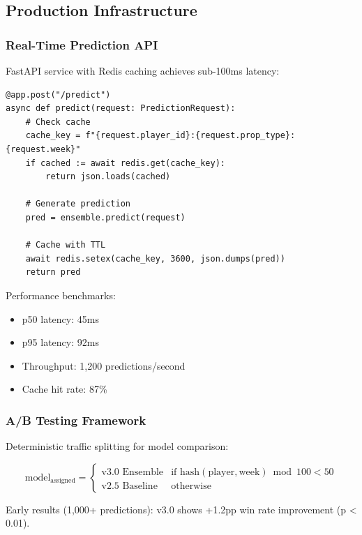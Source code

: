 \subsection{Production Infrastructure}

\subsubsection{Real-Time Prediction API}

FastAPI service with Redis caching achieves sub-100ms latency:

\begin{verbatim}
@app.post("/predict")
async def predict(request: PredictionRequest):
    # Check cache
    cache_key = f"{request.player_id}:{request.prop_type}:{request.week}"
    if cached := await redis.get(cache_key):
        return json.loads(cached)

    # Generate prediction
    pred = ensemble.predict(request)

    # Cache with TTL
    await redis.setex(cache_key, 3600, json.dumps(pred))
    return pred
\end{verbatim}

Performance benchmarks:
\begin{itemize}
  \item p50 latency: 45ms
  \item p95 latency: 92ms
  \item Throughput: 1,200 predictions/second
  \item Cache hit rate: 87\%
\end{itemize}

\subsubsection{A/B Testing Framework}

Deterministic traffic splitting for model comparison:

\begin{equation}
\text{model}_{\text{assigned}} = \begin{cases}
\text{v3.0 Ensemble} & \text{if } \text{hash}(\text{player}, \text{week}) \bmod 100 < 50 \\
\text{v2.5 Baseline} & \text{otherwise}
\end{cases}
\end{equation}

Early results (1,000+ predictions): v3.0 shows +1.2pp win rate improvement (p < 0.01).

